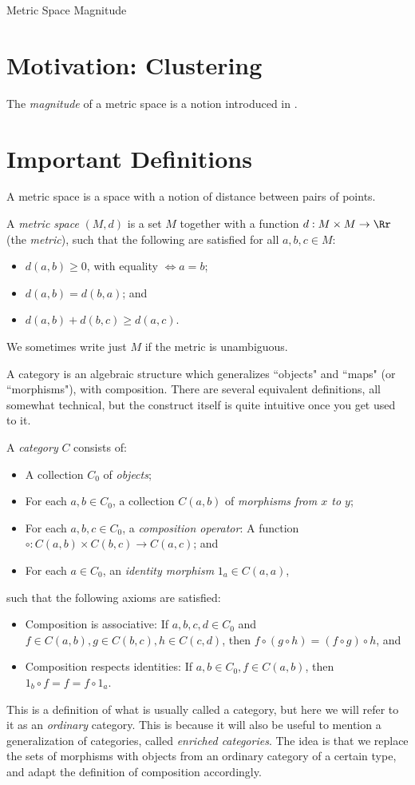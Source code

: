 \documentclass[12pt]{pom_thesis}
\begin{document}
\begin{chapter}{Metric Space Magnitude}
\section{Motivation: Clustering}
The \emph{magnitude} of a metric space is a notion introduced in \cite{Lein2}. %
\section{Important Definitions}
A metric space is a space with a notion of distance between pairs of points. 
\begin{defn}
A \textit{metric space} $(M,d)$ is a set $M$ together with a function  $d:M \times M \rightarrow \Rr$ (the \emph{metric}), such that the following are satisfied for all $a,b,c \in M$:
\begin{itemize}
\item $d(a,b) \geq 0$, with equality $\iff a = b$;
\item $d(a,b) = d(b,a)$; and
\item $d(a,b) + d(b,c) \geq d(a,c)$.
\end{itemize}
We sometimes write just $M$ if the metric is unambiguous.
\end{defn}
A category is an algebraic structure which generalizes ``objects" and ``maps" (or ``morphisms"), with composition. There are several equivalent definitions, all somewhat technical, but the construct itself is quite intuitive once you get used to it.  
\begin{defn}
A \textit{category} $C$ consists of:
\begin{itemize}
\item A collection $C_0$ of \emph{objects};
\item For each $a,b \in C_0$, a collection $C(a,b)$ of \emph{morphisms from $x$ to $y$};
\item For each $a,b,c \in C_0$, a \emph{composition operator}: A function $\circ:C(a,b) \times C(b,c) \rightarrow C(a,c)$; and
\item For each $a \in C_0$, an \emph{identity morphism} $1_a \in C(a,a)$,
\end{itemize}
such that the following axioms are satisfied:
\begin{itemize}
\item Composition is associative: If $a,b,c,d \in C_0$ and $f\in C(a,b), g \in C(b,c), h \in C(c,d)$, then $f \circ (g \circ h) = (f \circ g) \circ h$, and
\item Composition respects identities: If $a,b \in C_0, f \in C(a,b)$, then $1_b \circ f = f = f \circ 1_a$.
\end{itemize}
\end{defn}
This is a definition of what is usually called a category, but here we will refer to it as an \emph{ordinary} category. This is because it will also be useful to mention a generalization of categories, called \emph{enriched categories}. The idea is that we replace the sets of morphisms with objects from an ordinary category of a certain type, and adapt the definition of composition accordingly. 


\end{chapter}
\end{document}
